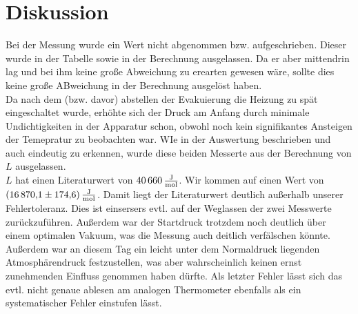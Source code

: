 \section{Diskussion}
\label{sec:Diskussion}

Bei der Messung wurde ein Wert nicht abgenommen bzw. aufgeschrieben. Dieser wurde in der Tabelle sowie in der Berechnung ausgelassen. 
Da er aber mittendrin lag und bei ihm keine große Abweichung zu erearten gewesen wäre, sollte dies keine große ABweichung in der 
Berechnung ausgelöst haben.\\
Da nach dem (bzw. davor) abstellen der Evakuierung die Heizung zu spät eingeschaltet wurde, erhöhte sich der Druck am Anfang durch 
minimale Undichtigkeiten in der Apparatur schon, obwohl noch kein signifikantes Ansteigen der Temepratur zu beobachten war. WIe in 
der Auswertung beschrieben und auch eindeutig zu erkennen, wurde diese beiden Messerte aus der Berechnung von $L$ ausgelassen.\\
$L$ hat einen Literaturwert von $\SI{40 660}{\frac{\joule}{\mol}}$. Wir kommen auf einen Wert von
$\SI{16 870,1\pm174,6}{\frac{\joule}{\mol}}$. Damit liegt der Literaturwert deutlich außerhalb unserer Fehlertoleranz. Dies ist einsersers evtl. auf der Weglassen der zwei Messwerte 
zurückzuführen. Außerdem war der Startdruck trotzdem noch deutlich über einem optimalen Vakuum, was die Messung auch deitlich verfälschen könnte. Außerdem war an diesem Tag ein leicht unter dem
Normaldruck liegenden Atmosphärendruck festzustellen, was aber wahrscheinlich keinen ernst zunehmenden Einfluss genommen haben dürfte. Als letzter Fehler lässt sich das evtl. nicht genaue
ablesen am analogen Thermometer ebenfalls als ein systematischer Fehler einstufen lässt.
